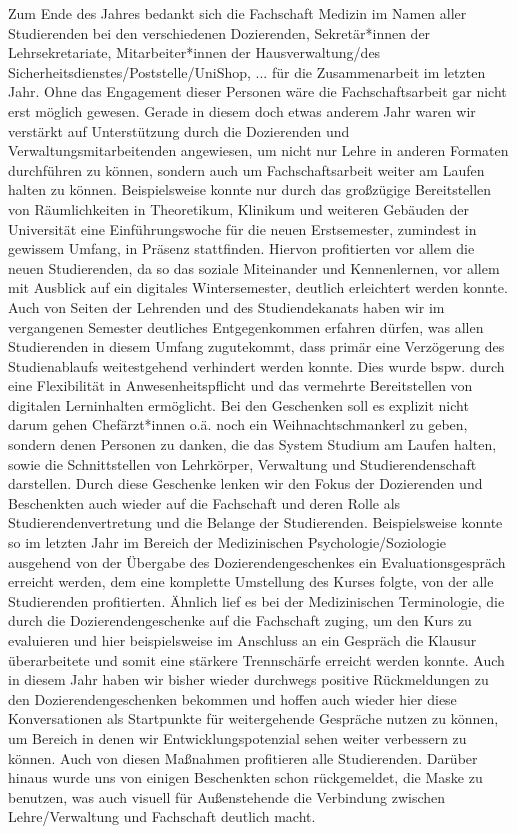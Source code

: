{    Zum Ende des Jahres bedankt sich die Fachschaft Medizin im Namen aller Studierenden bei den verschiedenen Dozierenden, Sekretär*innen der Lehrsekretariate, Mitarbeiter*innen der Hausverwaltung/des Sicherheitsdienstes/Poststelle/UniShop, ... für die Zusammenarbeit im letzten Jahr. Ohne das Engagement dieser Personen wäre die Fachschaftsarbeit gar nicht erst möglich gewesen. Gerade in diesem doch etwas anderem Jahr waren wir verstärkt auf Unterstützung durch die Dozierenden und Verwaltungsmitarbeitenden angewiesen, um nicht nur Lehre in anderen Formaten durchführen zu können, sondern auch um Fachschaftsarbeit weiter am Laufen halten zu können. Beispielsweise konnte nur durch das großzügige Bereitstellen von Räumlichkeiten in Theoretikum, Klinikum und weiteren Gebäuden der Universität eine Einführungswoche für die neuen Erstsemester, zumindest in gewissem Umfang, in Präsenz stattfinden. Hiervon profitierten vor allem die neuen Studierenden, da so das soziale Miteinander und Kennenlernen, vor allem mit Ausblick auf ein digitales Wintersemester, deutlich erleichtert werden konnte. Auch von Seiten der Lehrenden und des Studiendekanats haben wir im vergangenen Semester deutliches Entgegenkommen erfahren dürfen, was allen Studierenden in diesem Umfang zugutekommt, dass primär eine Verzögerung des Studienablaufs weitestgehend verhindert werden konnte. Dies wurde bspw. durch eine Flexibilität in Anwesenheitspflicht und das vermehrte Bereitstellen von digitalen Lerninhalten ermöglicht. Bei den Geschenken soll es explizit nicht darum gehen Chefärzt*innen o.ä. noch ein Weihnachtschmankerl zu geben, sondern denen Personen zu danken, die das System Studium am Laufen halten, sowie die Schnittstellen von Lehrkörper, Verwaltung und Studierendenschaft darstellen. Durch diese Geschenke lenken wir den Fokus der Dozierenden und Beschenkten auch wieder auf die Fachschaft und deren Rolle als Studierendenvertretung und die Belange der Studierenden. Beispielsweise konnte so im letzten Jahr im Bereich der Medizinischen Psychologie/Soziologie ausgehend von der Übergabe des Dozierendengeschenkes ein Evaluationsgespräch erreicht werden, dem eine komplette Umstellung des Kurses folgte, von der alle Studierenden profitierten. Ähnlich lief es bei der Medizinischen Terminologie, die durch die Dozierendengeschenke auf die Fachschaft zuging, um den Kurs zu evaluieren und hier beispielsweise im Anschluss an ein Gespräch die Klausur überarbeitete und somit eine stärkere Trennschärfe erreicht werden konnte. Auch in diesem Jahr haben wir bisher wieder durchwegs positive Rückmeldungen zu den Dozierendengeschenken bekommen und hoffen auch wieder hier diese Konversationen als Startpunkte für weitergehende Gespräche nutzen zu können, um Bereich in denen wir Entwicklungspotenzial sehen weiter verbessern zu können. Auch von diesen Maßnahmen profitieren alle Studierenden. Darüber hinaus wurde uns von einigen Beschenkten schon rückgemeldet, die Maske zu benutzen, was auch visuell für Außenstehende die Verbindung zwischen Lehre/Verwaltung und Fachschaft deutlich macht.\\
}
